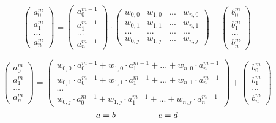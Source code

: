 \documentclass{article}
\begin{document}
\[ 
\left(\begin{array}{c} a_0^m \\ a_1^m \\ ... \\ a_n^m \end{array}\right)
=
\left(\begin{array}{c} a_0^{m-1} \\ a_1^{m-1} \\ ... \\ a_n^{m-1} \end{array}\right)
\cdot
\begin{pmatrix}
    w_{0,0} & w_{1,0} & ... & w_{n,0} \\
    w_{0,1} & w_{1,1} & ... & w_{n,1} \\
    ... & ... & ... & ... \\
    w_{0,j} & w_{1,j} & ... & w_{n,j}
\end{pmatrix}
+
\left(\begin{array}{c} b_0^m \\ b_1^m \\ ... \\ b_n^m \end{array}\right)
 \]

 \[
\left(\begin{array}{c} a_0^m \\ a_1^m \\ ... \\ a_n^m \end{array}\right)
=
\left(\begin{array}{c}
    w_{0,0} \cdot a_0^{m-1} + w_{1,0} \cdot a_1^{m-1} + ... + w_{n,0} \cdot a_n^{m-1} \\
    w_{0,1} \cdot a_0^{m-1} + w_{1,1} \cdot a_1^{m-1} + ... + w_{n,1} \cdot a_n^{m-1} \\
    ... \\
    w_{0,j} \cdot a_0^{m-1} + w_{1,j} \cdot a_1^{m-1} + ... + w_{n,j} \cdot a_n^{m-1}
\end{array}\right)
+
\left(\begin{array}{c} b_0^m \\ b_1^m \\ ... \\ b_n^m \end{array}\right)
\]
\[ a = b \kern 50pt c = d \]
\end{document}
